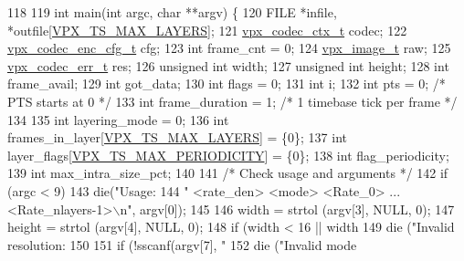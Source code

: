 \begin{DoxyCodeInclude}
{{118 
119 \textcolor{keywordtype}{int} main(\textcolor{keywordtype}{int} argc, \textcolor{keywordtype}{char} **argv) \{
120     FILE                *infile, *outfile[\hyperlink{group__encoder_ga2715ac3dd8bf2f5438c4bbfc82788eb2}{VPX\_TS\_MAX\_LAYERS}];
121     \hyperlink{structvpx__codec__ctx}{vpx\_codec\_ctx\_t}      codec;
122     \hyperlink{structvpx__codec__enc__cfg}{vpx\_codec\_enc\_cfg\_t}  cfg;
123     \textcolor{keywordtype}{int}                  frame\_cnt = 0;
124     \hyperlink{structvpx__image}{vpx\_image\_t}          raw;
125     \hyperlink{group__codec_gada1084710837ad363b92f2379dd2b8d2}{vpx\_codec\_err\_t}      res;
126     \textcolor{keywordtype}{unsigned} \textcolor{keywordtype}{int}         width;
127     \textcolor{keywordtype}{unsigned} \textcolor{keywordtype}{int}         height;
128     \textcolor{keywordtype}{int}                  frame\_avail;
129     \textcolor{keywordtype}{int}                  got\_data;
130     \textcolor{keywordtype}{int}                  flags = 0;
131     \textcolor{keywordtype}{int}                  i;
132     \textcolor{keywordtype}{int}                  pts = 0;              \textcolor{comment}{/* PTS starts at 0 */}
133     \textcolor{keywordtype}{int}                  frame\_duration = 1;   \textcolor{comment}{/* 1 timebase tick per frame */}
134 
135     \textcolor{keywordtype}{int}                  layering\_mode = 0;
136     \textcolor{keywordtype}{int}                  frames\_in\_layer[\hyperlink{group__encoder_ga2715ac3dd8bf2f5438c4bbfc82788eb2}{VPX\_TS\_MAX\_LAYERS}] = \{0\};
137     \textcolor{keywordtype}{int}                  layer\_flags[\hyperlink{group__encoder_ga684b48cb6e47a258247637186557eb19}{VPX\_TS\_MAX\_PERIODICITY}] = \{0\};
138     \textcolor{keywordtype}{int}                  flag\_periodicity;
139     \textcolor{keywordtype}{int}                  max\_intra\_size\_pct;
140 
141     \textcolor{comment}{/* Check usage and arguments */}
142     \textcolor{keywordflow}{if} (argc < 9)
143         die(\textcolor{stringliteral}{"Usage: %
144             \textcolor{stringliteral}{" <rate\_den> <mode> <Rate\_0> ... <Rate\_nlayers-1>\(\backslash\)n"}, argv[0]);
145 
146     width  = strtol (argv[3], NULL, 0);
147     height = strtol (argv[4], NULL, 0);
148     \textcolor{keywordflow}{if} (width < 16 || width%
149         die (\textcolor{stringliteral}{"Invalid resolution: %
150 
151     \textcolor{keywordflow}{if} (!sscanf(argv[7], \textcolor{stringliteral}{"%
152         die (\textcolor{stringliteral}{"Invalid mode %
}}}}}}
\end{DoxyCodeInclude}
